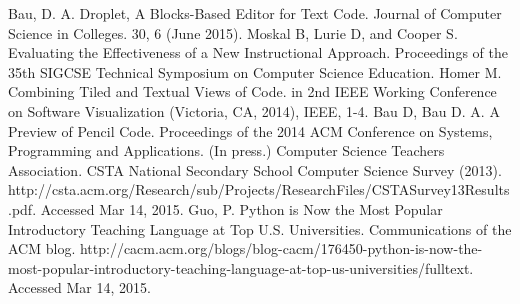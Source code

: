 \documentclass[conference]{IEEEtran}
\begin{document}
\begin{thebibliography}{1}

  Bau, D. A. Droplet, A Blocks-Based Editor for Text Code. Journal of Computer Science in Colleges. 30, 6 (June 2015).
  Moskal B, Lurie D, and Cooper S. Evaluating the Effectiveness of a New Instructional Approach. Proceedings of the 35th SIGCSE Technical Symposium on Computer Science Education.
  Homer M. Combining Tiled and Textual Views of Code. in 2nd IEEE Working Conference on Software Visualization (Victoria, CA, 2014), IEEE, 1-4.
  Bau D, Bau D. A. A Preview of Pencil Code. Proceedings of the 2014 ACM Conference on Systems, Programming and Applications. (In press.)
  Computer Science Teachers Association. CSTA National Secondary School Computer Science Survey (2013). http://csta.acm.org/Research/sub/Projects/ResearchFiles/CSTASurvey13Results.pdf. Accessed Mar 14, 2015.
  Guo, P. Python is Now the Most Popular Introductory Teaching Language at Top U.S. Universities. Communications of the ACM blog. http://cacm.acm.org/blogs/blog-cacm/176450-python-is-now-the-most-popular-introductory-teaching-language-at-top-us-universities/fulltext. Accessed Mar 14, 2015.


\end{thebibliography}

\end{document}
